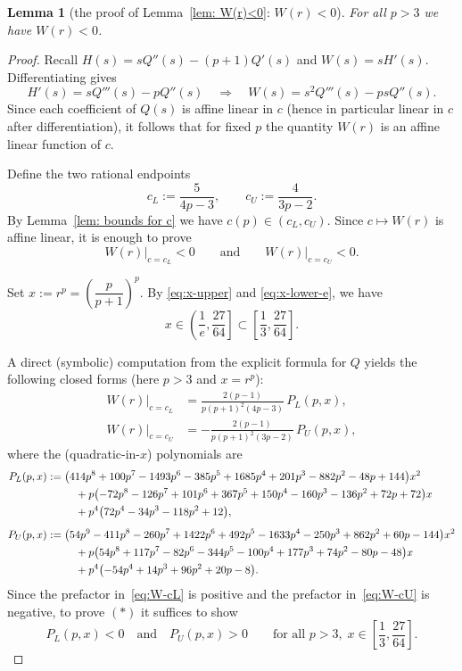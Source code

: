 \documentclass[11pt]{article}
\newtheorem{lemma}[theorem]{Lemma}
\theoremstyle{definition}
\newcommand{\1}{\mathbf{1}}
\begin{document}
\begin{lemma}[the proof of Lemma~\ref{lem: W(r)<0}: $W(r)<0$]
  For all $p>3$  we have $W(r)<0$.
\end{lemma}
\begin{proof}
Recall $H(s)=sQ''(s)-(p+1)Q'(s)$ and $W(s)=sH'(s)$. Differentiating gives
\[
H'(s)=sQ'''(s)-pQ''(s)
\quad\Longrightarrow\quad
W(s)=s^2Q'''(s)-psQ''(s).
\]
Since each coefficient of $Q(s)$ is affine linear in $c$ (hence in particular
linear in $c$ after differentiation), it follows that for fixed $p$ the quantity
$W(r)$ is an affine linear function of $c$.

\smallskip
Define the two rational endpoints
\[
c_L:=\frac{5}{4p-3},
\qquad
c_U:=\frac{4}{3p-2}.
\]
By Lemma~\ref{lem: bounds for c} we have $c(p)\in(c_L,c_U)$. Since $c\mapsto W(r)$ is
affine linear, it is enough to prove
\[
W(r)\big|_{c=c_L}<0
\qquad\text{and}\qquad
W(r)\big|_{c=c_U}<0.
\tag{$\ast$}
\]

\smallskip
Set $x:=r^p=\left(\dfrac{p}{p+1}\right)^p$. By \eqref{eq:x-upper} and \eqref{eq:x-lower-e}, we have
\[
x\in\left(\frac1e,\frac{27}{64}\right]\subset \left[\frac13,\frac{27}{64}\right].
\]

\smallskip
A direct (symbolic) computation from the explicit formula for $Q$ yields the
following closed forms (here $p>3$ and $x=r^p$):
\begin{align}
W(r)\big|_{c=c_L}
&=\frac{2(p-1)}{p(p+1)^2(4p-3)}\,P_L(p,x),\label{eq:W-cL}\\[0.3em]
W(r)\big|_{c=c_U}
&=-\frac{2(p-1)}{p(p+1)^2(3p-2)}\,P_U(p,x),\label{eq:W-cU}
\end{align}
where the (quadratic-in-$x$) polynomials are
\begin{align}
P_L(p,x):={}&\bigl(414 p^8 +100 p^7 -1493 p^6 -385 p^5 +1685 p^4 +201 p^3 -882 p^2 -48 p +144\bigr)x^2 \notag\\
&\quad +p\bigl(-72 p^8 -126 p^7 +101 p^6 +367 p^5 +150 p^4 -160 p^3 -136 p^2 +72 p +72\bigr)x \notag\\
&\quad +p^4\bigl(72 p^4 -34 p^3 -118 p^2 +12\bigr),\label{eq:PL}\\[0.5em]
P_U(p,x):={}&\bigl(54 p^9 -411 p^8 -260 p^7 +1422 p^6 +492 p^5 -1633 p^4 -250 p^3 +862 p^2 +60 p -144\bigr)x^2 \notag\\
&\quad +p\bigl(54 p^8 +117 p^7 -82 p^6 -344 p^5 -100 p^4 +177 p^3 +74 p^2 -80 p -48\bigr)x \notag\\
&\quad +p^4\bigl(-54 p^4 +14 p^3 +96 p^2 +20 p -8\bigr).\label{eq:PU}
\end{align}
Since the prefactor in~\eqref{eq:W-cL} is positive and the prefactor in~\eqref{eq:W-cU}
is negative, to prove $(\ast)$ it suffices to show
\[
P_L(p,x)<0
\quad\text{and}\quad
P_U(p,x)>0
\qquad\text{for all }p>3,\; x\in\left[\frac13,\frac{27}{64}\right].
\tag{$\ast\ast$}
\]


\end{proof}
\end{document}
